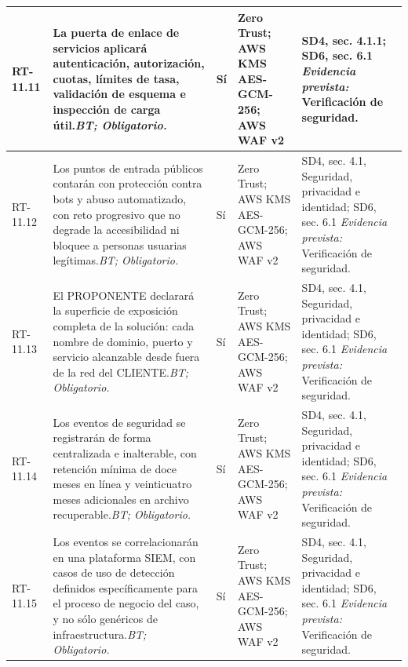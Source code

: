 \begin{paginaHorizontalSynaptix}
\begin{longtable}{|L{0.09\AnchoMatrizTDoce}|L{0.385\AnchoMatrizTDoce}|L{0.065\AnchoMatrizTDoce}|L{0.18\AnchoMatrizTDoce}|L{0.28\AnchoMatrizTDoce}|}
RT-\allowbreak{}11.\allowbreak{}11 &
La puerta de enlace de servicios aplicará autenticación, autorización, cuotas, límites de tasa, validación de esquema e inspección de carga útil.\newline\textit{BT; Obligatorio.} &
Sí &
Zero Trust; AWS KMS AES-GCM-256; AWS WAF v2 &
SD4, sec. 4.1.1; SD6, sec. 6.1 \newline\textit{Evidencia prevista:} Verificación de seguridad. \\ \hline

RT-\allowbreak{}11.\allowbreak{}12 &
Los puntos de entrada públicos contarán con protección contra bots y abuso automatizado, con reto progresivo que no degrade la accesibilidad ni bloquee a personas usuarias legítimas.\newline\textit{BT; Obligatorio.} &
Sí &
Zero Trust; AWS KMS AES-GCM-256; AWS WAF v2 &
SD4, sec. 4.1, Seguridad, privacidad e identidad; SD6, sec. 6.1 \newline\textit{Evidencia prevista:} Verificación de seguridad. \\ \hline

RT-\allowbreak{}11.\allowbreak{}13 &
El PROPONENTE declarará la superficie de exposición completa de la solución: cada nombre de dominio, puerto y servicio alcanzable desde fuera de la red del CLIENTE.\newline\textit{BT; Obligatorio.} &
Sí &
Zero Trust; AWS KMS AES-GCM-256; AWS WAF v2 &
SD4, sec. 4.1, Seguridad, privacidad e identidad; SD6, sec. 6.1 \newline\textit{Evidencia prevista:} Verificación de seguridad. \\ \hline

RT-\allowbreak{}11.\allowbreak{}14 &
Los eventos de seguridad se registrarán de forma centralizada e inalterable, con retención mínima de doce meses en línea y veinticuatro meses adicionales en archivo recuperable.\newline\textit{BT; Obligatorio.} &
Sí &
Zero Trust; AWS KMS AES-GCM-256; AWS WAF v2 &
SD4, sec. 4.1, Seguridad, privacidad e identidad; SD6, sec. 6.1 \newline\textit{Evidencia prevista:} Verificación de seguridad. \\ \hline

RT-\allowbreak{}11.\allowbreak{}15 &
Los eventos se correlacionarán en una plataforma SIEM, con casos de uso de detección definidos específicamente para el proceso de negocio del caso, y no sólo genéricos de infraestructura.\newline\textit{BT; Obligatorio.} &
Sí &
Zero Trust; AWS KMS AES-GCM-256; AWS WAF v2 &
SD4, sec. 4.1, Seguridad, privacidad e identidad; SD6, sec. 6.1 \newline\textit{Evidencia prevista:} Verificación de seguridad. \\ \hline


\end{longtable}
\end{paginaHorizontalSynaptix}
